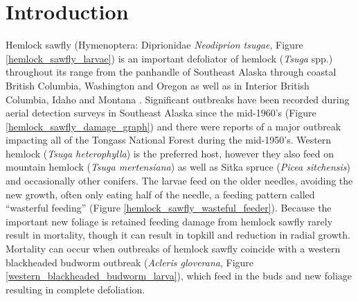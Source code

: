 \section{Introduction}

Hemlock sawfly (Hymenoptera: Diprionidae \textit{Neodiprion tsugae}, Figure \ref{hemlock_sawfly_larvae}) is an important defoliator of hemlock (\textit{Tsuga} spp.)  throughout its range from the panhandle of Southeast Alaska through coastal British Columbia, Washington and Oregon as well as in Interior British Columbia, Idaho and Montana \citep{Hardetal1976}.  Significant outbreaks have been recorded during aerial detection surveys in Southeast Alaska since the mid-1960’s (Figure \ref{hemlock_sawfly_damage_graph}) and there were reports of a major outbreak impacting all of the Tongass National Forest during the mid-1950’s. Western hemlock (\textit{Tsuga heterophylla}) is the preferred host, however they also feed on mountain hemlock (\textit{Tsuga mertensiana}) as well as Sitka spruce (\textit{Picea sitchensis}) and occasionally other conifers.  The larvae feed on the older needles, avoiding the new growth, often only eating half of the needle, a feeding pattern called “wasterful feeding” (Figure \ref{hemlock_sawfly_wasteful_feeder}).  Because the important new foliage is retained feeding damage from hemlock sawfly rarely result in mortality, though it can result in topkill and reduction in radial growth.  Mortality can occur when outbreaks of hemlock sawfly coincide with a western blackheaded budworm outbreak (\textit{Acleris gloverana}, Figure \ref{western_blackheaded_budworm_larva}), which feed in the buds and new foliage resulting in complete defoliation. 

